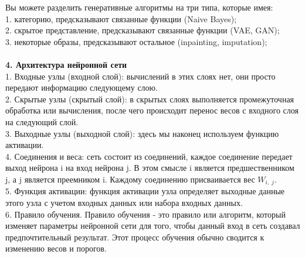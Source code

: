 \documentclass{article}
\begin{document}
Вы можете разделить генеративные алгоритмы на три типа, которые имея: \\
  1. категорию, предсказывают связанные функции (Naive Bayes); \\
  2. скрытое представление, предсказывают связанные функции (VAE, GAN); \\
  3. некоторые образы, предсказывают остальное (inpainting, imputation); \\ \\
    \textbf{4. Архитектура нейронной сети}\\
    1. Входные узлы (входной слой): вычислений в этих слоях нет, они просто передают информацию следующему слою.\\
    2. Скрытые узлы (скрытый слой): в скрытых слоях выполняется промежуточная обработка или вычисления, после чего происходит перенос весов с входного слоя на следующий слой.\\
    3. Выходные узлы (выходной слой): здесь мы наконец используем функцию активации.\\
    4. Соединения и веса: сеть состоит из соединений, каждое соединение передает выход нейрона i на вход нейрона j. В этом смысле i является предшественником j, а j является преемником i. Каждому соединению присваивается вес $W_{i,\;j}$.\\
    5. Функция активации: функция активации узла определяет выходные данные этого узла с учетом входных данных или набора входных данных. \\
    6. Правило обучения. Правило обучения - это правило или алгоритм, который изменяет параметры нейронной сети для того, чтобы данный вход в сеть создавал предпочтительный результат. Этот процесс обучения обычно сводится к изменению весов и порогов.\\
    
\end{document}
